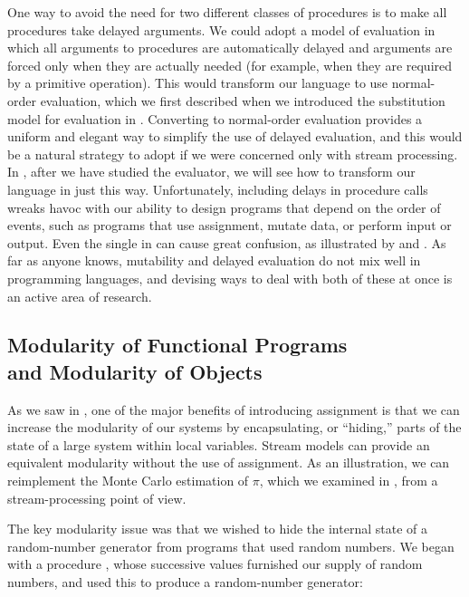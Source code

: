 One way to avoid the need for two different classes of procedures is to make
all procedures take delayed arguments.  We could adopt a model of evaluation in
which all arguments to procedures are automatically delayed and arguments are
forced only when they are actually needed (for example, when they are required
by a primitive operation).  This would transform our language to use
normal-order evaluation, which we first described when we introduced the
substitution model for evaluation in .  Converting to
normal-order evaluation provides a uniform and elegant way to simplify the use
of delayed evaluation, and this would be a natural strategy to adopt if we were
concerned only with stream processing.  In , after we have
studied the evaluator, we will see how to transform our language in just this
way.  Unfortunately, including delays in procedure calls wreaks havoc with our
ability to design programs that depend on the order of events, such as programs
that use assignment, mutate data, or perform input or output.  Even the single
 in  can cause great confusion, as illustrated by
 and .  As far as anyone knows,
mutability and delayed evaluation do not mix well in programming languages, and
devising ways to deal with both of these at once is an active area of research.

\subsection{Modularity of Functional Programs\\ and Modularity of Objects}
\label{Section 3.5.5}

As we saw in , one of the major benefits of introducing
assignment is that we can increase the modularity of our systems by
encapsulating, or ``hiding,'' parts of the state of a large system within local
variables.  Stream models can provide an equivalent modularity without the use
of assignment.  As an illustration, we can reimplement the Monte Carlo
estimation of \( \pi \), which we examined in , from a
stream-processing point of view.

The key modularity issue was that we wished to hide the internal state of a
random-number generator from programs that used random numbers.  We began with
a procedure , whose successive values furnished our supply of
random numbers, and used this to produce a random-number generator:

